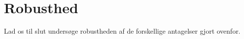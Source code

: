 \documentclass{article}
\begin{document}
\section{Robusthed}
\label{sec:antag}
Lad os til slut undersøge robustheden af de forskellige antagelser gjort ovenfor. 

%
%
\end{document}
